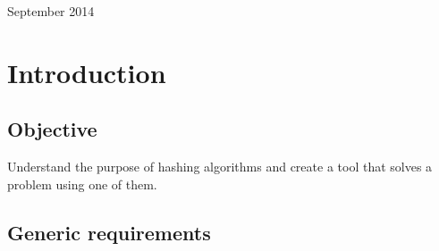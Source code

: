 \documentclass{article}
\begin{document}
\begin{titlepage}
\begin{center}
  \vspace{15 mm}


  {\large September 2014}\\[3cm] %




  \vfill %
  \end{center}
  \end{titlepage}



  \section{Introduction}

  \subsection{Objective}

  Understand the purpose of hashing algorithms and create a tool that solves a problem using one of them.

  \subsection{Generic requirements}
\end{document}
